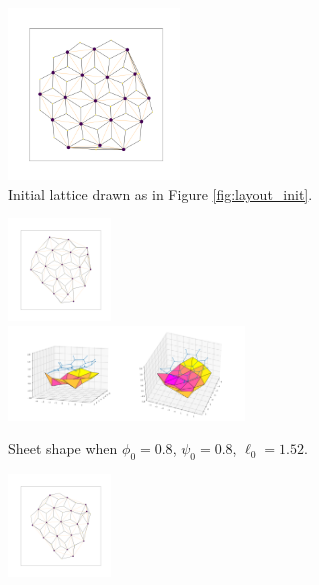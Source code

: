 \documentclass[draft]{article}
\begin{document}
\begin{figure}[htbp]
    \centering
    \begin{subfigure}[b]{\textwidth}
        \centering
        \includegraphics[width=0.5\textwidth]{figures/numerical/hexnoise/hexnoise_graph.png}
        \caption{Initial lattice drawn as in Figure \ref{fig:layout_init}.}
        \label{subfig:hexnoise_graph}
    \end{subfigure}
    \begin{subfigure}[b]{\textwidth}
        \centering
        \includegraphics[width=0.3\textwidth]{figures/numerical/hexnoise/hexnoise0.8_0.8_1.52_10_graph.png}
        \includegraphics[width=0.69\textwidth]{figures/numerical/hexnoise/hexnoise0.8_0.8_1.52_10_plot.png}
        \caption{Sheet shape when $\phi_0=0.8$, $\psi_0=0.8$, $\ell_0=1.52$.}
        \label{subfig:hexnoise_in}
    \end{subfigure}
    \begin{subfigure}[b]{\textwidth}
        \centering
        \includegraphics[width=0.3\textwidth]{figures/numerical/hexnoise/hexnoise0.95_0.8_1.52_10_graph.png}

\end{subfigure}
\end{figure}
\end{document}
